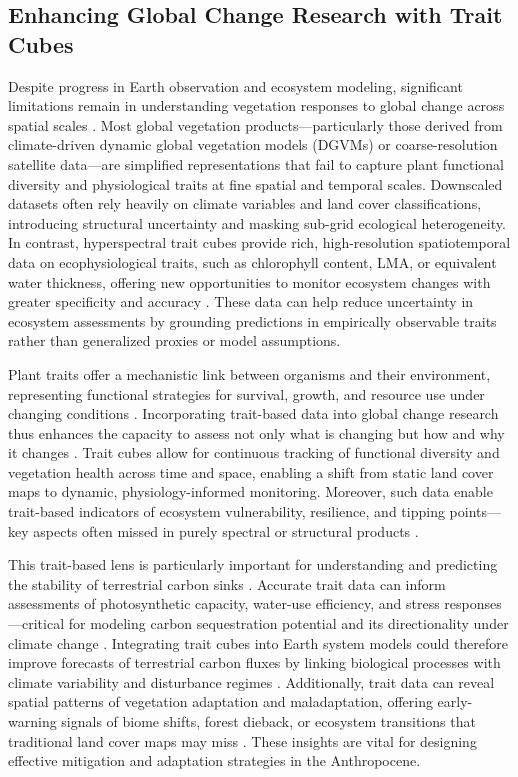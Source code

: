 \documentclass[pdflatex,sn-mathphys-num]{sn-jnl}%
\theoremstyle{thmstyleone}%
\theoremstyle{thmstyletwo}%
\theoremstyle{thmstylethree}%
\begin{document}
\subsection{Enhancing Global Change Research with Trait Cubes}\label{subsec4}
Despite progress in Earth observation and ecosystem modeling, significant limitations remain in understanding vegetation responses to global change across spatial scales \cite{higgins2023shifts}. Most global vegetation products—particularly those derived from climate-driven dynamic global vegetation models (DGVMs) or coarse-resolution satellite data—are simplified representations that fail to capture plant functional diversity and physiological traits at fine spatial and temporal scales. Downscaled datasets often rely heavily on climate variables and land cover classifications, introducing structural uncertainty and masking sub-grid ecological heterogeneity. In contrast, hyperspectral trait cubes provide rich, high-resolution spatiotemporal data on ecophysiological traits, such as chlorophyll content, LMA, or equivalent water thickness, offering new opportunities to monitor ecosystem changes with greater specificity and accuracy \cite{zhao2021hyperspectral}. These data can help reduce uncertainty in ecosystem assessments by grounding predictions in empirically observable traits rather than generalized proxies or model assumptions.

Plant traits offer a mechanistic link between organisms and their environment, representing functional strategies for survival, growth, and resource use under changing conditions \cite{solbrig1994plant,funk2017revisiting}. Incorporating trait-based data into global change research thus enhances the capacity to assess not only what is changing but how and why it changes \cite{xu2021trait,green2022trait}. Trait cubes allow for continuous tracking of functional diversity and vegetation health across time and space, enabling a shift from static land cover maps to dynamic, physiology-informed monitoring. Moreover, such data enable trait-based indicators of ecosystem vulnerability, resilience, and tipping points—key aspects often missed in purely spectral or structural products \cite{gallagher2021guide,brown2023trait}.

This trait-based lens is particularly important for understanding and predicting the stability of terrestrial carbon sinks \cite{xu2021trait}. Accurate trait data can inform assessments of photosynthetic capacity, water-use efficiency, and stress responses—critical for modeling carbon sequestration potential and its directionality under climate change \cite{gago2014opportunities}. Integrating trait cubes into Earth system models could therefore improve forecasts of terrestrial carbon fluxes by linking biological processes with climate variability and disturbance regimes \cite{anderegg2015tree,peng2021global}. Additionally, trait data can reveal spatial patterns of vegetation adaptation and maladaptation, offering early-warning signals of biome shifts, forest dieback, or ecosystem transitions that traditional land cover maps may miss \cite{scheffer2009early,boulton2022pronounced,tai2023linking}. These insights are vital for designing effective mitigation and adaptation strategies in the Anthropocene.
\end{document}
